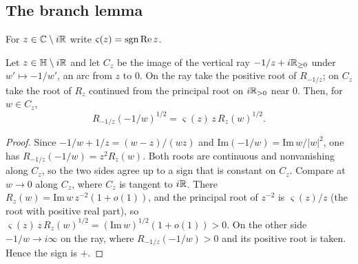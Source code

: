 \subsection{The branch lemma}
For $z\in\mathbb{C}\setminus i\mathbb{R}$ write $\varsigma(z)=\operatorname{sgn}\mathrm{Re}\,z$.
\begin{lemma}\label{lem:branch}
Let $z\in\mathbb{H}\setminus i\mathbb{R}$ and let $C_z$ be the image of the vertical ray $-1/z+i\mathbb{R}_{\ge0}$ under $w'\mapsto-1/w'$, an arc from $z$ to $0$. On the ray take
the positive root of $R_{-1/z}$; on $C_z$ take the root of $R_z$ continued from the principal root on $i\mathbb{R}_{>0}$ near $0$. Then, for $w\in C_z$,
\[
R_{-1/z}(-1/w)^{1/2}=\varsigma(z)\,z\,R_z(w)^{1/2}.
\]
\end{lemma}
\begin{proof}
Since $-1/w+1/z=(w-z)/(wz)$ and $\mathrm{Im}(-1/w)=\mathrm{Im}\,w/|w|^2$, one has $R_{-1/z}(-1/w)=z^2R_z(w)$. Both roots are continuous and nonvanishing along
$C_z$, so the two sides agree up to a sign that is constant on $C_z$. Compare at $w\to0$ along $C_z$, where $C_z$ is tangent to $i\mathbb{R}$. There
$R_z(w)=\mathrm{Im}\,w\,z^{-2}(1+o(1))$, and the principal root of $z^{-2}$ is $\varsigma(z)/z$ (the root with positive real part), so
$\varsigma(z)\,z\,R_z(w)^{1/2}=(\mathrm{Im}\,w)^{1/2}(1+o(1))>0$. On the other side $-1/w\to i\infty$ on the ray, where $R_{-1/z}(-1/w)>0$ and its
positive root is taken. Hence the sign is $+$.
\end{proof}

